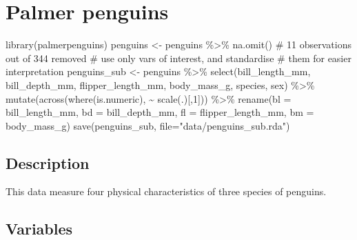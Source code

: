 \documentclass[
  letterpaper,
]{book}
\newenvironment{Shaded}{\begin{snugshade}}{\end{snugshade}}
\newcommand{\AttributeTok}[1]{\textcolor[rgb]{0.40,0.45,0.13}{#1}}
\newcommand{\CommentTok}[1]{\textcolor[rgb]{0.37,0.37,0.37}{#1}}
\newcommand{\DecValTok}[1]{\textcolor[rgb]{0.68,0.00,0.00}{#1}}
\newcommand{\FunctionTok}[1]{\textcolor[rgb]{0.28,0.35,0.67}{#1}}
\newcommand{\NormalTok}[1]{\textcolor[rgb]{0.00,0.23,0.31}{#1}}
\newcommand{\OtherTok}[1]{\textcolor[rgb]{0.00,0.23,0.31}{#1}}
\newcommand{\SpecialCharTok}[1]{\textcolor[rgb]{0.37,0.37,0.37}{#1}}
\newcommand{\StringTok}[1]{\textcolor[rgb]{0.13,0.47,0.30}{#1}}
\begin{document}
\hypertarget{palmer-penguins}{%
\section{Palmer penguins}\label{palmer-penguins}}

\begin{Shaded}
\begin{Highlighting}[]
\FunctionTok{library}\NormalTok{(palmerpenguins)}
\NormalTok{penguins }\OtherTok{\textless{}{-}}\NormalTok{ penguins }\SpecialCharTok{\%\textgreater{}\%}
  \FunctionTok{na.omit}\NormalTok{() }\CommentTok{\# 11 observations out of 344 removed}
\CommentTok{\# use only vars of interest, and standardise}
\CommentTok{\# them for easier interpretation}
\NormalTok{penguins\_sub }\OtherTok{\textless{}{-}}\NormalTok{ penguins }\SpecialCharTok{\%\textgreater{}\%} 
  \FunctionTok{select}\NormalTok{(bill\_length\_mm,}
\NormalTok{         bill\_depth\_mm,}
\NormalTok{         flipper\_length\_mm,}
\NormalTok{         body\_mass\_g,}
\NormalTok{         species, }
\NormalTok{         sex) }\SpecialCharTok{\%\textgreater{}\%} 
  \FunctionTok{mutate}\NormalTok{(}\FunctionTok{across}\NormalTok{(}\FunctionTok{where}\NormalTok{(is.numeric),  }\SpecialCharTok{\textasciitilde{}} \FunctionTok{scale}\NormalTok{(.)[,}\DecValTok{1}\NormalTok{])) }\SpecialCharTok{\%\textgreater{}\%}
  \FunctionTok{rename}\NormalTok{(}\AttributeTok{bl =}\NormalTok{ bill\_length\_mm,}
         \AttributeTok{bd =}\NormalTok{ bill\_depth\_mm,}
         \AttributeTok{fl =}\NormalTok{ flipper\_length\_mm,}
         \AttributeTok{bm =}\NormalTok{ body\_mass\_g)}
\FunctionTok{save}\NormalTok{(penguins\_sub, }\AttributeTok{file=}\StringTok{"data/penguins\_sub.rda"}\NormalTok{)}
\end{Highlighting}
\end{Shaded}

\hypertarget{description-3}{%
\subsection*{Description}\label{description-3}}

This data measure four physical characteristics of three species of
penguins.

\hypertarget{variables-3}{%
\subsection*{Variables}\label{variables-3}}
\end{document}
